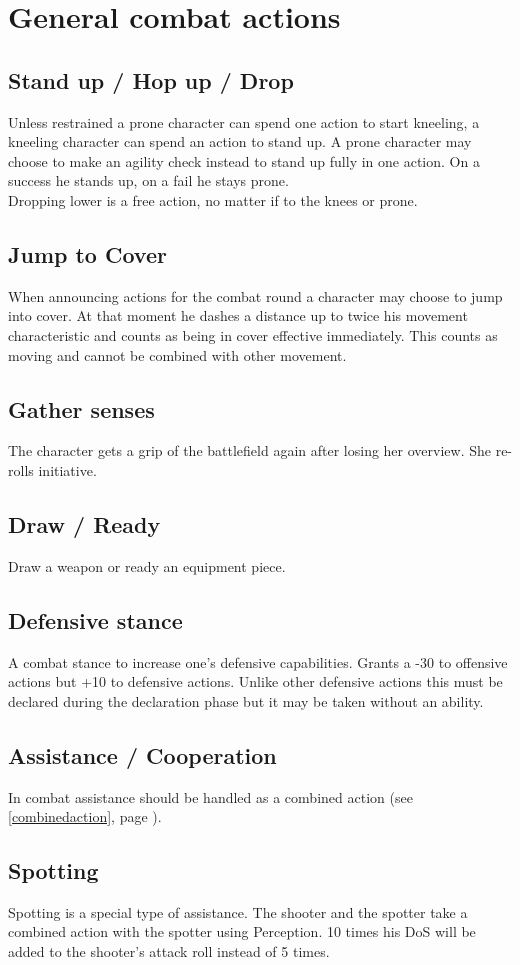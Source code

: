\newpage
\section{General combat actions}
\subsection*{Stand up / Hop up / Drop}
Unless restrained a prone character can spend one action to start kneeling, a kneeling character can spend an action to stand up. A prone character may choose to make an agility check instead to stand up fully in one action. On a success he stands up, on a fail he stays prone.\\
Dropping lower is a free action, no matter if to the knees or prone.
\subsection*{Jump to Cover}
When announcing actions for the combat round a character may choose to jump into cover. At that moment he dashes a distance up to twice his movement characteristic and counts as being in cover effective immediately. This counts as moving and cannot be combined with other movement.
\subsection*{Gather senses}
The character gets a grip of the battlefield again after losing her overview. She re-rolls initiative.
\subsection*{Draw / Ready}
Draw a weapon or ready an equipment piece.
\subsection*{Defensive stance}
A combat stance to increase one’s defensive capabilities. Grants a -30 to offensive actions but +10 to defensive actions. Unlike other defensive actions this must be declared during the declaration phase but it may be taken without an ability.
\subsection*{Assistance / Cooperation}
In combat assistance should be handled as a combined action (see \ref{combinedaction}, page \pageref{combinedaction}).
\subsection*{Spotting}
Spotting is a special type of assistance. The shooter and the spotter take a combined action with the spotter using Perception. 10 times his DoS will be added to the shooter’s attack roll instead of 5 times.
